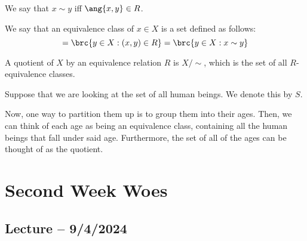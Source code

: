 \documentclass[openany]{book}
\begin{document}
We say that $x \sim y$ iff $\ang{x, y} \in R$.

\begin{defn}
	We say that an equivalence class of $x \in X$ is a set defined as follows:
	\begin{equation*}
		[x] = \brc{y \in X : (x, y) \in R} = \brc{y \in X : x \sim y}
	\end{equation*}
\end{defn}

\begin{defn}[Quotient]
	A quotient of $X$ by an equivalence relation $R$ is $X/\sim$, which is the set of all $R$-equivalence classes.
\end{defn}

\begin{example}
	Suppose that we are looking at the set of all human beings. We denote this by $S$.
	
	Now, one way to partition them up is to group them into their ages. Then, we can think of each age as being an equivalence class, containing all the human beings that fall under said age. Furthermore, the set of all of the ages can be thought of as the quotient.
\end{example}

\chapter{Second Week Woes}
\section{Lecture -- 9/4/2024}
\end{document}
